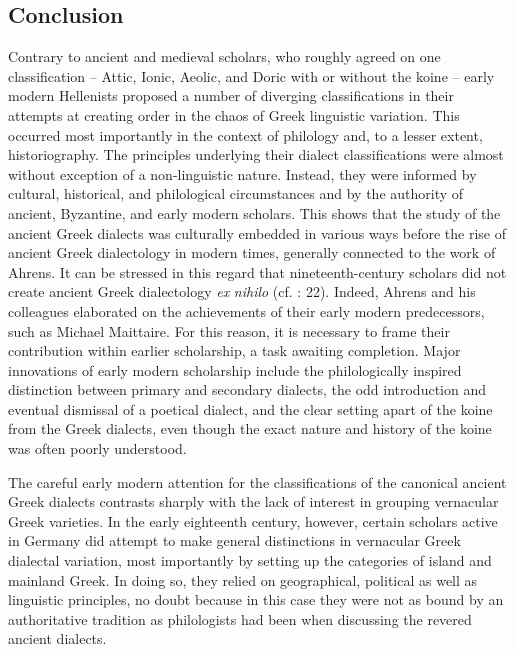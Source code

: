 \documentclass[output=paper]{langsci/langscibook}
\begin{document}
\subsection{Conclusion}
\hypertarget{Toc19704817}{}
Contrary to ancient and medieval scholars, who roughly agreed on one classification – Attic, Ionic, Aeolic, and Doric with or without the koine – early modern Hellenists proposed a number of diverging classifications in their attempts at creating order in the chaos of Greek linguistic variation. This occurred most importantly in the context of philology and, to a lesser extent, historiography. The principles underlying their dialect classifications were almost without exception of a non-linguistic nature. Instead, they were informed by cultural, historical, and philological circumstances and by the authority of ancient, Byzantine, and early modern scholars. This shows that the study of the ancient Greek dialects was culturally embedded in various ways before the rise of ancient Greek dialectology in modern times, generally connected to the work of Ahrens. It can be stressed in this regard that nineteenth-century scholars did not create ancient Greek dialectology \textit{ex} \textit{nihilo} (cf. \citealt{Colvin2007}: 22). Indeed, Ahrens and his colleagues elaborated on the achievements of their early modern predecessors, such as Michael Maittaire. For this reason, it is necessary to frame their contribution within earlier scholarship, a task awaiting completion. Major innovations of early modern scholarship include the philologically inspired distinction between primary and secondary dialects, the odd introduction and eventual dismissal of a poetical dialect, and the clear setting apart of the koine from the Greek dialects, even though the exact nature and history of the koine was often poorly understood.

The careful early modern attention for the classifications of the canonical ancient Greek dialects contrasts sharply with the lack of interest in grouping vernacular Greek varieties. In the early eighteenth century, however, certain scholars active in Germany did attempt to make general distinctions in vernacular Greek dialectal variation, most importantly by setting up the categories of island and mainland Greek. In doing so, they relied on geographical, political as well as linguistic principles, no doubt because in this case they were not as bound by an authoritative tradition as philologists had been when discussing the revered ancient dialects.
\end{document}
